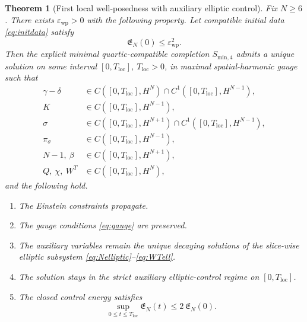 \documentclass[11pt]{article}
\newtheorem{theorem}{Theorem}
\begin{document}
\begin{theorem}[First local well-posedness with auxiliary elliptic control]
Fix \(N\ge 6\). There exists \(\varepsilon_{\mathrm{wp}}>0\) with the following property. Let compatible initial data \eqref{eq:initdata} satisfy
\begin{equation}
\mathfrak E_N(0)\le \varepsilon_{\mathrm{wp}}^2.
\label{eq:wpsmall}
\end{equation}
Then the explicit minimal quartic-compatible completion \(S_{\mathrm{min},4}\) admits a unique solution on some interval \([0,T_{\mathrm{loc}}]\), \(T_{\mathrm{loc}}>0\), in maximal spatial-harmonic gauge such that
\begin{align}
\gamma-\delta &\in C([0,T_{\mathrm{loc}}],H^N)\cap C^1([0,T_{\mathrm{loc}}],H^{N-1}),
\label{eq:reggamma}
\\
K &\in C([0,T_{\mathrm{loc}}],H^{N-1}),
\label{eq:regK}
\\
\sigma &\in C([0,T_{\mathrm{loc}}],H^{N+1})\cap C^1([0,T_{\mathrm{loc}}],H^{N-1}),
\label{eq:regsigma}
\\
\pi_\sigma &\in C([0,T_{\mathrm{loc}}],H^{N-1}),
\label{eq:regpi}
\\
N-1,\ \beta
&\in C([0,T_{\mathrm{loc}}],H^{N+1}),
\label{eq:reggauge}
\\
Q,\ \chi,\ W^T
&\in C([0,T_{\mathrm{loc}}],H^N),
\label{eq:regaux}
\end{align}
and the following hold.
\begin{enumerate}
    \item The Einstein constraints propagate.
    \item The gauge conditions \eqref{eq:gauge} are preserved.
    \item The auxiliary variables remain the unique decaying solutions of the slice-wise elliptic subsystem \eqref{eq:Nelliptic}--\eqref{eq:WTell}.
    \item The solution stays in the strict auxiliary elliptic-control regime on \([0,T_{\mathrm{loc}}]\).
    \item The closed control energy satisfies
    \begin{equation}
    \sup_{0\le t\le T_{\mathrm{loc}}}\mathfrak E_N(t)
    \le
    2\,\mathfrak E_N(0).
    \label{eq:localbound}
    \end{equation}
\end{enumerate}
\end{theorem}
\end{document}
